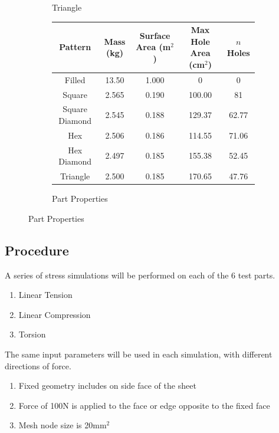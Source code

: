 \documentclass[12pt, letterpaper]{article}
\begin{document}
\begin{figure}[H]
\begin{subfigure}[b]{.3\linewidth}
		\caption{Triangle}
	\end{subfigure}
	\begin{subfigure}[b]{\linewidth}
	\begingroup
	\setlength{\tabcolsep}{10pt} %
	\renewcommand{\arraystretch}{1.5} %
		\begin{tabular}{ | c | c | c | c | c | }\hline
			Pattern 			& Mass (kg) 	& Surface Area (m$^2$)	& Max Hole Area (cm$^2$) 	& $n$ Holes 	\\\hline
			Filled				& 13.50 		& 1.000 						& 0			 					& 0			\\\hline
			Square			& 2.565 		& 0.190 						& 100.00		 					& 81			\\\hline
			Square Diamond	& 2.545 		& 0.188 						& 129.37	 						& 62.77		\\\hline
			Hex				& 2.506 		& 0.186 						& 114.55	 						& 71.06		\\\hline
			Hex Diamond		& 2.497 		& 0.185 						& 155.38	 						& 52.45		\\\hline
			Triangle			& 2.500 		& 0.185						& 170.65				 			& 47.76		\\\hline
		\end{tabular}
		\caption{Part Properties}
	\endgroup
	\end{subfigure}
\end{figure}

\subsection{Procedure}
\label{sec:procedure}

A series of stress simulations will be performed on each of the 6 test parts. 

\begin{enumerate}
\item Linear Tension
\item Linear Compression
\item Torsion
\end{enumerate}

The same input parameters will be used in each simulation, with different directions of force. 

\begin{enumerate}
\item Fixed geometry includes on side face of the sheet
\item Force of 100N is applied to the face or edge opposite to the fixed face
\item Mesh node size is 20mm$^2$
\end{enumerate}
\end{document}
